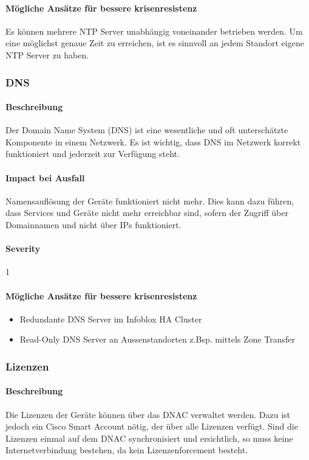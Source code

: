 \paragraph{Mögliche Ansätze für bessere krisenresistenz}
Es können mehrere NTP Server unabhängig voneinander betrieben werden. Um eine möglichst genaue Zeit zu erreichen, ist es sinnvoll an jedem Standort eigene NTP Server zu haben.

\subsubsection{DNS}
\paragraph{Beschreibung}
Der Domain Name System (DNS) ist eine wesentliche und oft unterschätzte Komponente in einem Netzwerk. Es ist wichtig, dass DNS im Netzwerk korrekt funktioniert und jederzeit zur Verfügung steht.

\paragraph{Impact bei Ausfall}
Namensauflösung der Geräte funktioniert nicht mehr. Dies kann dazu führen, dass Services und Geräte nicht mehr erreichbar sind, sofern der Zugriff über Domainnamen und nicht über IPs funktioniert.

\paragraph{Severity} 1

\paragraph{Mögliche Ansätze für bessere krisenresistenz}
\begin{itemize}
	\item Redundante DNS Server im Infoblox HA Cluster
	\item Read-Only DNS Server an Aussenstandorten z.Bsp. mittels Zone Transfer
\end{itemize}

\subsubsection{Lizenzen}
\paragraph{Beschreibung}
Die Lizenzen der Geräte können über das DNAC verwaltet werden. Dazu ist jedoch ein Cisco Smart Account nötig, der über alle Lizenzen verfügt. Sind die Lizenzen einmal auf dem DNAC synchronisiert und ersichtlich, so muss keine Internetverbindung bestehen, da kein Lizenzenforcement besteht.

